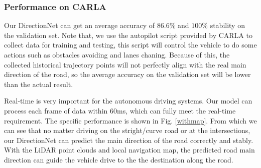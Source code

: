 \documentclass[letterpaper,10 pt,conference]{ieeeconf}  %
\begin{document}
\subsubsection{Performance on CARLA}
Our DirectionNet can get an average accuracy of $86.6\%$ and $100\%$ stability on the validation set. Note that, we use the autopilot script provided by CARLA to collect data for training and testing, this script will control the vehicle to do some actions such as obstacles avoiding and lanes chaning. Because of this, the collected historical trajectory points will not perfectly align with the real main direction of the road, so the average accuracy on the validation set will be lower than the actual result.

Real-time is very important for the autonomous driving systems. Our model can process each frame of data within 60ms, which can fully meet the real-time requirement. The specific performance is shown in Fig. \ref{withmap}. From which we can see that no matter driving on the stright/curve road or at the intersections, our DirectionNet can predict the main direction of the road correctly and stably. With the LiDAR point clouds and local navigation map, the predicted road main direction can guide the vehicle drive to the the destination along the road.
\end{document}
